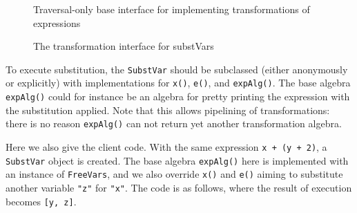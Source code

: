 \begin{figure}[t]
\vspace{-.1in}
\caption{Traversal-only base interface for implementing transformations of expressions}
\label{generic_transform}
\end{figure}


\begin{figure}[t]
\vspace{-.1in}
\caption{The transformation interface for substVars}
\label{substvars_with_id}
\end{figure}


To execute substitution, the \lstinline{SubstVar} should be subclassed (either anonymously or explicitly) with implementations for \lstinline{x()}, \lstinline{e()}, and \lstinline{expAlg()}.
The base algebra \lstinline{expAlg()} could for instance be an algebra for pretty printing the expression with the substitution applied.
Note that this allows pipelining of transformations: there is no reason  \lstinline{expAlg()} can not return yet another transformation algebra.


Here we also give the client code. With the same expression \lstinline{x + (y + 2)}, a \lstinline{SubstVar} object is created. The base algebra \lstinline{expAlg()} here is implemented with an instance of \lstinline{FreeVars}, and we also override \lstinline{x()} and \lstinline{e()} aiming to substitute another variable \lstinline{"z"} for \lstinline{"x"}. The code is as follows, where the result of execution becomes \lstinline{[y, z]}.







